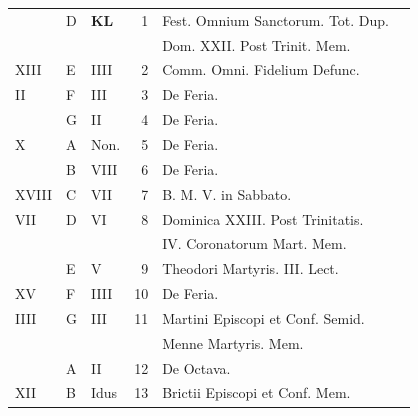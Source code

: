 

\thispagestyle{fancy}


\vspace{+.5em}
\color{Red}\color{black}

\begin{center}
\begin{tabular}{l | l | l | r | l l}
\color{Red}  & D & \textbf{\color{Red} K\color{Blue}L} & 1 & Fest. Omnium Sanctorum. Tot. Dup. & \color{Red} \\
& & & & \quad Dom. XXII. Post Trinit. Mem. \\
\color{Red} XIII & E & \color{Red} IIII & 2 & Comm. Omni. Fidelium Defunc. & \\
\color{Red} II & F & \color{Red} III & 3 & De Feria. & \color{Red} \\
\color{Red}  & G & \color{Red} II & 4 & De Feria. & \color{Red} \\
\color{Red} X & \color{Red} A & \color{Red} Non. & 5 & De Feria. & \color{Red} \\
\color{Red}  & B & \color{Red} VIII & 6 & De Feria. & \color{Red} \\
\color{Red} XVIII & C & \color{Red} VII & 7 & B. M. V. in Sabbato. & \color{Red} \\
\color{Red} VII & D & \color{Red} VI & 8 & Dominica XXIII. Post Trinitatis. \\
& & & & \quad IV. Coronatorum Mart. Mem. & \color{Red} \\
\color{Red}  & E & \color{Red} V & 9 & Theodori Martyris. III. Lect. & \color{Red} \\
\color{Red} XV & F & \color{Red} IIII & 10 & De Feria. & \color{Red} \\
\color{Red} IIII & G & \color{Red} III & 11 & \multicolumn{2}{l}{\color{Red} Martini Episcopi et Conf. Semid. } \\
& & & & \quad \color{Red} Menne Martyris. Mem. \color{Red} \\
\color{Red}  & \color{Red} A & \color{Red} II & 12 & De Octava. & \color{Red} \\
\color{Red} XII & B & \color{Red} Idus & 13 & Brictii Episcopi et Conf. Mem. & \color{Red} \\

\end{tabular}
\end{center}
